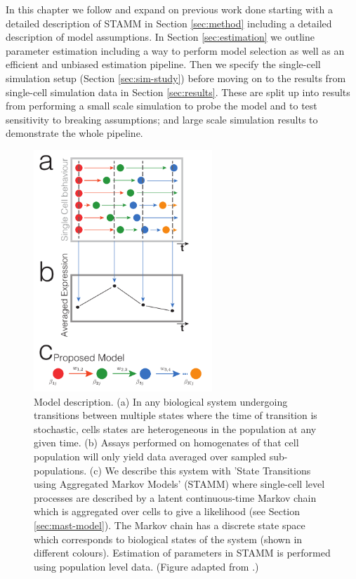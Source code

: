 In this chapter we follow and expand on previous work done starting with a detailed description of STAMM in Section \ref{sec:method} including a detailed description of model assumptions. In Section \ref{sec:estimation} we outline parameter estimation including a way to perform model selection as well as an efficient and unbiased estimation pipeline. Then we specify the single-cell simulation setup (Section \ref{sec:sim-study})  before moving on to the results from single-cell simulation data in Section \ref{sec:results}. These are split up into results from performing a small scale simulation to probe the model and to test sensitivity to breaking assumptions; and large scale simulation results to demonstrate the whole pipeline.

\begin{figure}[!t]
  \centering
  \includegraphics[width=0.6\textwidth]{pics/model_fig.pdf}
  \caption{Model description. (a) In any biological system undergoing transitions between multiple states where the time of transition is stochastic, cells states are heterogeneous in the population at any given time.  (b) Assays performed on homogenates of that cell population will only yield data averaged over sampled sub-populations. (c) We describe this system with 'State Transitions using Aggregated Markov Models' (STAMM) where single-cell level processes are described by a latent continuous-time Markov chain which is aggregated over cells to give a likelihood (see Section \ref{sec:mast-model}). The Markov chain has a discrete state space which corresponds to biological states of the system (shown in different colours). Estimation of parameters in STAMM is performed using population level data. (Figure adapted from \cite{Armond:2013}.)  }
  \label{fig:model-sketch}
\end{figure}

